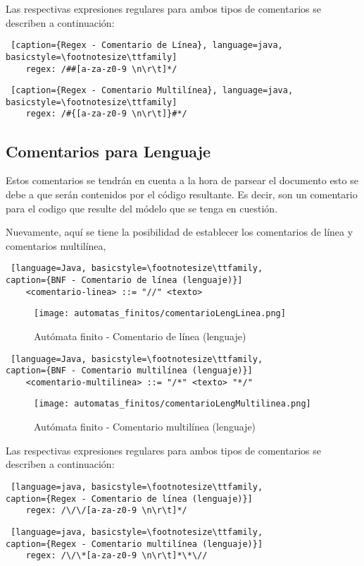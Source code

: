 Las respectivas expresiones regulares para ambos tipos de comentarios se
describen a continuación:

\begin{lstlisting} [caption={Regex - Comentario de Línea}, language=java, basicstyle=\footnotesize\ttfamily]
	regex: /##[a-za-z0-9 \n\r\t]*/
\end{lstlisting}

\begin{lstlisting} [caption={Regex - Comentario Multilínea}, language=java, basicstyle=\footnotesize\ttfamily]
	regex: /#{[a-za-z0-9 \n\r\t]}#*/
\end{lstlisting}

\subsection{Comentarios para Lenguaje}
\label{sub:comentarioleng}
Estos comentarios se tendrán en cuenta a la hora de parsear el documento esto
se debe a que serán contenidos por el código resultante. Es decir, son un
comentario para el codigo que resulte del módelo que se tenga en cuestión.

Nuevamente, aquí se tiene la posibilidad de establecer los comentarios de línea
y comentarios multilínea,

\begin{lstlisting} [language=Java, basicstyle=\footnotesize\ttfamily,
caption={BNF - Comentario de línea (lenguaje)}]
	<comentario-linea> ::= "//" <texto>
\end{lstlisting}

\begin{figure}[H]
	\centering
	\texttt{[image: automatas\_finitos/comentarioLengLinea.png]}
	\caption{Autómata finito - Comentario de línea (lenguaje)}
	\label{fig:af_com_linea_leng}
\end{figure}

\begin{lstlisting} [language=Java, basicstyle=\footnotesize\ttfamily,
caption={BNF - Comentario multilínea (lenguaje)}]
	<comentario-multilinea> ::= "/*" <texto> "*/"
\end{lstlisting}

\begin{figure}[H]
	\centering
	\texttt{[image: automatas\_finitos/comentarioLengMultilinea.png]}
	\caption{Autómata finito - Comentario multilínea (lenguaje)}
	\label{fig:af_com_multi_leng}
\end{figure}

Las respectivas expresiones regulares para ambos tipos de comentarios se
describen a continuación:

\begin{lstlisting} [language=java, basicstyle=\footnotesize\ttfamily,
caption={Regex - Comentario de línea (lenguaje)}]
	regex: /\/\/[a-za-z0-9 \n\r\t]*/
\end{lstlisting}

\begin{lstlisting} [language=java, basicstyle=\footnotesize\ttfamily,
caption={Regex - Comentario multilínea (lenguaje)}]
	regex: /\/\*[a-za-z0-9 \n\r\t]*\*\//
\end{lstlisting}

